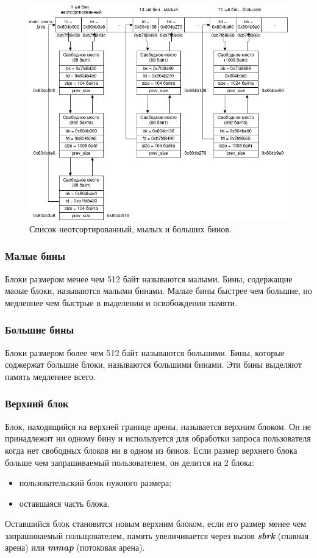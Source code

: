 \begin{figure}[!h]
	\begin{center}
		\includegraphics[scale=0.6]{images/glibc-malloc-all-bins.png}
		\caption{Список неотсортированный, мылых и больших бинов.}
		\label{glibc-malloc-all-bins}
	\end{center}
\end{figure}

\subsubsection{Малые бины}
Блоки размером менее чем 512 байт называются малыми. Бины, содержащие маоые блоки, называются малыми бинами. Малые бины быстрее чем большие, но медленнее чем быстрые в выделении и освобождении памяти.

\subsubsection{Большие бины}
Блоки размером более чем 512 байт называются большими. Бины, которые соджержат большие блоки, называются большими бинами. Эти бины выделяют память медленнее всего.

\subsubsection{Верхний блок}
Блок, находящийся на верхней границе арены, называется верхним блоком. Он не принадлежит ни одному бину и используется для обработки запроса пользователя когда нет свободных блоков ни в одном из бинов. Если размер верхнего блока больше чем запрашиваемый пользователем, он делится на 2 блока:
\begin{itemize}
	\item пользовательский блок нужного размера;
	\item оставшаяся часть блока.
\end{itemize}
Оставшийся блок становится новым верхним блоком, если его размер менее чем запрашиваемый польщователем, память увеличивается через вызов \textit{\textbf{sbrk}} (главная арена) или \textit{\textbf{mmap}} (потоковая арена).

